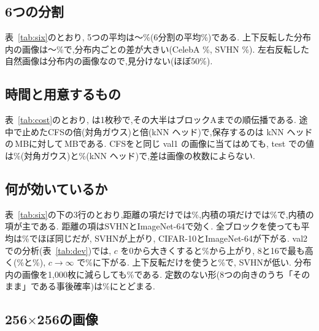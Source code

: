 \subsection{6つの分割}
\label{sec:six}
表~\ref{tab:six}のとおり, 5つの平均は\olSixMin{}〜\olSixMax\%(6分割の平均\olSixMean\%)である. 上下反転した分布内の画像は\olSixVfMin{}〜\olSixVfMax\%で,分布内ごとの差が大きい(CelebA \olSixVfCelebA\%, SVHN \olSixVfSVHN\%). 左右反転した自然画像は分布内の画像なので,見分けない(ほぼ50\%).

\subsection{時間と用意するもの}
\label{sec:cost}
表~\ref{tab:cost}のとおり, \Ours{}は1枚\olSecOL{}秒で,その大半はブロックAまでの順伝播である. 途中で止めたCFSの\olSecRatioCfs{}倍(対角ガウス)と\olSecRatioCfsKnn{}倍(kNN ヘッド)で,保存するのは kNN ヘッドの\olMBCfsKnn\,MBに対して\olMBOurs\,MBである. CFSを\Ours{}と同じ val1 の画像に当てはめても, test での値は\olCfsValMean\%(対角ガウス)と\olCfsKnnValMean\%(kNN ヘッド)で,差は画像の枚数によらない.

\subsection{何が効いているか}
\label{sec:ablate}
表~\ref{tab:six}の下の3行のとおり,距離の項だけでは\olSixT\%,内積の項だけでは\olSixL\%で,内積の項が主である. 距離の項はSVHNとImageNet-64で効く. 全ブロックを使っても平均は\olSixAll\%でほぼ同じだが, SVHNが上がり, CIFAR-10とImageNet-64が下がる. val2 での分析(表~\ref{tab:dev})では, $c$ を0から大きくすると\olDevCzero\%から上がり, 8と16で最も高く(\olDevCeight\%と\olDevCsixteen\%), $c\to\infty$ で\olDevCinf\%に下がる. 上下反転だけを使うと\olDevOv\%で, SVHNが低い. 分布内の画像を1{,}000枚に減らしても\olDevNthousand\%である. 定数のない形(8つの向きのうち「そのまま」である事後確率)は\olDevPk\%にとどまる.

\subsection{256{$\times$}256の画像}
\label{sec:hr}
\OLHRTEXT

